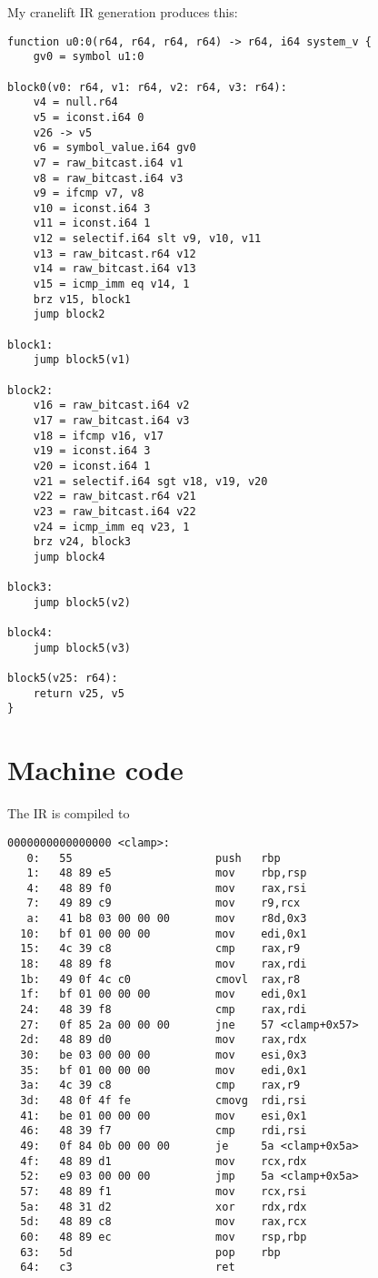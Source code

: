 My cranelift IR generation produces this:

\begin{verbatim}
function u0:0(r64, r64, r64, r64) -> r64, i64 system_v {
    gv0 = symbol u1:0

block0(v0: r64, v1: r64, v2: r64, v3: r64):
    v4 = null.r64 
    v5 = iconst.i64 0
    v26 -> v5
    v6 = symbol_value.i64 gv0
    v7 = raw_bitcast.i64 v1
    v8 = raw_bitcast.i64 v3
    v9 = ifcmp v7, v8
    v10 = iconst.i64 3
    v11 = iconst.i64 1
    v12 = selectif.i64 slt v9, v10, v11
    v13 = raw_bitcast.r64 v12
    v14 = raw_bitcast.i64 v13
    v15 = icmp_imm eq v14, 1
    brz v15, block1
    jump block2

block1:
    jump block5(v1)

block2:
    v16 = raw_bitcast.i64 v2
    v17 = raw_bitcast.i64 v3
    v18 = ifcmp v16, v17
    v19 = iconst.i64 3
    v20 = iconst.i64 1
    v21 = selectif.i64 sgt v18, v19, v20
    v22 = raw_bitcast.r64 v21
    v23 = raw_bitcast.i64 v22
    v24 = icmp_imm eq v23, 1
    brz v24, block3
    jump block4

block3:
    jump block5(v2)

block4:
    jump block5(v3)

block5(v25: r64):
    return v25, v5
}
\end{verbatim}

\section{Machine code}

The IR is compiled to

\begin{verbatim}
0000000000000000 <clamp>:
   0:	55                   	push   rbp
   1:	48 89 e5             	mov    rbp,rsp
   4:	48 89 f0             	mov    rax,rsi
   7:	49 89 c9             	mov    r9,rcx
   a:	41 b8 03 00 00 00    	mov    r8d,0x3
  10:	bf 01 00 00 00       	mov    edi,0x1
  15:	4c 39 c8             	cmp    rax,r9
  18:	48 89 f8             	mov    rax,rdi
  1b:	49 0f 4c c0          	cmovl  rax,r8
  1f:	bf 01 00 00 00       	mov    edi,0x1
  24:	48 39 f8             	cmp    rax,rdi
  27:	0f 85 2a 00 00 00    	jne    57 <clamp+0x57>
  2d:	48 89 d0             	mov    rax,rdx
  30:	be 03 00 00 00       	mov    esi,0x3
  35:	bf 01 00 00 00       	mov    edi,0x1
  3a:	4c 39 c8             	cmp    rax,r9
  3d:	48 0f 4f fe          	cmovg  rdi,rsi
  41:	be 01 00 00 00       	mov    esi,0x1
  46:	48 39 f7             	cmp    rdi,rsi
  49:	0f 84 0b 00 00 00    	je     5a <clamp+0x5a>
  4f:	48 89 d1             	mov    rcx,rdx
  52:	e9 03 00 00 00       	jmp    5a <clamp+0x5a>
  57:	48 89 f1             	mov    rcx,rsi
  5a:	48 31 d2             	xor    rdx,rdx
  5d:	48 89 c8             	mov    rax,rcx
  60:	48 89 ec             	mov    rsp,rbp
  63:	5d                   	pop    rbp
  64:	c3                   	ret    

\end{verbatim}

